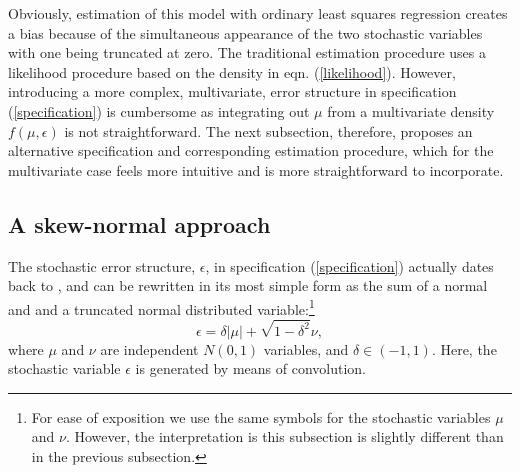 \documentclass[11pt,parskip,abstracton,notitlepage]{scrartcl}
\begin{document}
Obviously, estimation of this model with ordinary least squares regression creates a bias because of the simultaneous appearance of the two stochastic variables with one being truncated at zero. The traditional estimation procedure uses a likelihood procedure based on the density in eqn. (\ref{likelihood}). However, introducing a more complex, multivariate, error structure in specification (\ref{specification}) is cumbersome as integrating out $\mu$ from a multivariate density $f(\mu, \epsilon)$ is not straightforward. The next subsection, therefore, proposes an alternative specification and corresponding estimation procedure, which for the multivariate case feels more intuitive and is more straightforward to incorporate.
%
\subsection{A skew-normal approach}\label{sub:unisn}
%
The stochastic error structure, $\epsilon$, in specification (\ref{specification}) actually dates back to \citet{WEINSTEIN1964}, and can be rewritten in its most simple form as the sum of a normal and and a truncated normal distributed variable:\footnote{For ease of exposition we use the same symbols for the stochastic variables $\mu$ and $\nu$. However, the interpretation is this subsection is slightly different than in the previous subsection.}
%
\begin{equation}
\epsilon = \delta|\mu| + \sqrt{1-\delta^2}\nu,
\label{convolution}
\end{equation}
%
where $\mu$ and $\nu$ are independent $N(0,1)$ variables, and $\delta \in (-1,1)$. Here, the stochastic variable $\epsilon $ is generated by means of convolution.
\end{document}
